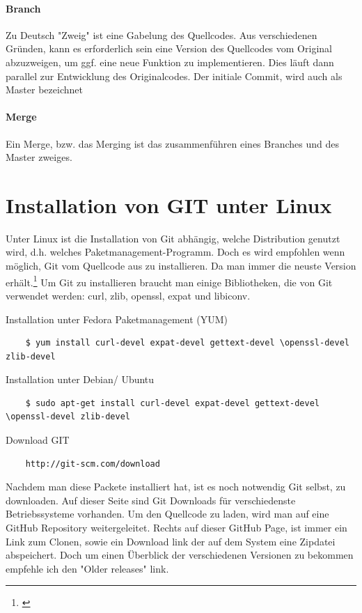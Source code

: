 \documentclass[12pt,a4paper,bibliography=totocnumbered,listof=totocnumbered]{scrartcl}
\begin{document}
\paragraph{Branch}
Zu Deutsch "Zweig" ist eine Gabelung des Quellcodes. Aus verschiedenen Gründen, kann es erforderlich sein eine Version des Quellcodes vom Original abzuzweigen, um ggf. eine neue Funktion zu implementieren. Dies läuft dann parallel zur Entwicklung des Originalcodes. Der initiale Commit, wird auch als Master bezeichnet 
\paragraph{Merge}
Ein Merge, bzw. das Merging ist das zusammenführen eines Branches und des Master zweiges. 



\section{Installation von GIT unter Linux}
Unter Linux ist die Installation von Git abhängig, welche Distribution genutzt wird, d.h. welches Paketmanagement-Programm. Doch es wird empfohlen wenn möglich, Git vom Quellcode aus zu installieren. Da man immer die neuste Version erhält.\footnote{\cite{chacon2009pro}} Um Git zu installieren braucht man einige Bibliotheken, die von Git verwendet werden: curl, zlib, openssl, expat und libiconv. 

Installation unter Fedora Paketmanagement (YUM)
\begin{lstlisting}
	$ yum install curl-devel expat-devel gettext-devel \openssl-devel zlib-devel
 \end{lstlisting}

Installation unter Debian/ Ubuntu
\begin{lstlisting}
	$ sudo apt-get install curl-devel expat-devel gettext-devel \openssl-devel zlib-devel
 \end{lstlisting}
 
Download GIT

\begin{lstlisting}
	http://git-scm.com/download
 \end{lstlisting}
 
 
Nachdem man diese Packete installiert hat, ist es noch notwendig Git selbst, zu downloaden. Auf dieser Seite sind Git Downloads für verschiedenste Betriebssysteme vorhanden. Um den Quellcode zu laden, wird man auf eine GitHub Repository weitergeleitet. Rechts auf dieser GitHub Page, ist immer ein Link zum Clonen, sowie ein Download link der auf dem System eine Zipdatei abspeichert. Doch um einen Überblick der verschiedenen Versionen zu bekommen 
empfehle ich den "Older releases"  link.
\end{document}
